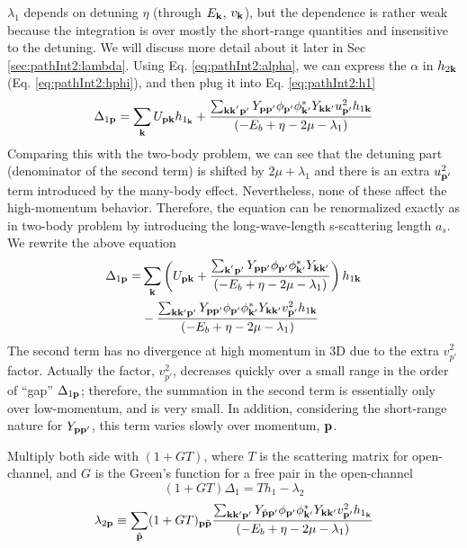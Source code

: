 $\lambda_{1}$ depends on detuning $\eta$ (through $E_{\mathbf{k}}$, $v_{\mathbf{k}}$), but the dependence is rather weak because the integration is over mostly the short-range quantities and  insensitive to the detuning. We will discuss more detail about it later in Sec \ref{sec:pathInt2:lambda}. 
Using Eq. \ref{eq:pathInt2:alpha}, we can express the $\alpha$ in $h_{2\mathbf{k}}$ (Eq. \ref{eq:pathInt2:hphi}), and then plug it into Eq. \ref{eq:pathInt2:h1}
\begin{equation*}
\Delta_{1\mathbf{p}}=\sum_{\mathbf{k}}{}U_{\mathbf{p}\mathbf{k}}{h_{1_{\mathbf{k}}}}+
	\frac{\sum_{\mathbf{k}\mathbf{k}^{'}\mathbf{p}'} Y_{\mathbf{p}\mathbf{p}'}{\phi_{\mathbf{p}'}}{\phi_{\mathbf{k}'}^{*}}{Y_{\mathbf{k}\mathbf{k}'}}u_{\mathbf{p}'}^{2}{{h_{1\mathbf{k}}}}}
		{\left(-E_{b}+\eta-2\mu-\lambda_{1}\right)}
\end{equation*}
Comparing this with the two-body problem, we can see that the detuning part (denominator of the second term) is shifted by $2\mu+\lambda_{1}$ and there is an extra $u_{\mathbf{p}'}^{2}$ term introduced by the many-body effect.  Nevertheless, none of these affect the high-momentum behavior. Therefore, the equation can be renormalized exactly as in two-body problem by introducing the long-wave-length s-scattering length $a_{s}$.  We rewrite the above equation
\begin{equation*}
\begin{split}
\Delta_{1\mathbf{p}}=&\sum_{\mathbf{k}}\left(U_{\mathbf{p}\mathbf{k}}+
	\frac{\sum_{\mathbf{k}^{'}\mathbf{p}'} Y_{\mathbf{p}\mathbf{p}'}{\phi_{\mathbf{p}'}}{\phi_{\mathbf{k}'}^{*}}{Y_{\mathbf{k}\mathbf{k}'}}}
		{\left(-E_{b}+\eta-2\mu-\lambda_{1}\right)}\right){{h_{1\mathbf{k}}}}\\
	&-\frac{\sum_{\mathbf{k}\mathbf{k}{'}\mathbf{p}'} Y_{\mathbf{p}\mathbf{p}'}{\phi_{\mathbf{p}'}}{\phi_{\mathbf{k}'}^{*}}{Y_{\mathbf{k}\mathbf{k}'}}v_{\mathbf{p}'}^{2}{h_{1\mathbf{k}}}}
		{\left(-E_{b}+\eta-2\mu-\lambda_{1}\right)}{}
\end{split}
\end{equation*}
The second term has no divergence at high momentum in 3D due to the extra $v_{p'}^{2}$ factor. Actually the factor, $v_{p'}^{2}$, decreases quickly over a small range in the order of  ``gap'' $\Delta_{1\mathbf{p}}$; therefore, the summation in the second term is essentially only over low-momentum, and is very small.   In addition, considering the short-range nature for $Y_{\mathbf{p}\mathbf{p}'}$, this term varies slowly over momentum, $\mathbf{p}$.  

Multiply both side with $(1+GT)$,  where $T$ is the scattering matrix for open-channel, and $G$ is the Green's function for a free pair in the open-channel
\begin{equation*}
(1+GT)\Delta_{1}=Th_{1}-\lambda_{2}
\end{equation*}
\begin{equation}\label{eq:pathInt2:lambda2}
\lambda_{2\mathbf{p}}\equiv\sum_{\tilde{\mathbf{p}}}(1+GT)_{\mathbf{p}\tilde{\mathbf{p}}}\frac{\sum_{\mathbf{k}\mathbf{k}{'}\mathbf{p}'} Y_{\tilde{\mathbf{p}}\mathbf{p}'}{\phi_{\mathbf{p}'}}{\phi_{\mathbf{k}'}^{*}}{Y_{\mathbf{k}\mathbf{k}'}}v_{\mathbf{p}'}^{2}{h_{1_{\mathbf{k}}}}}
		{\left(-E_{b}+\eta-2\mu-\lambda_{1}\right)}{}
\end{equation}

